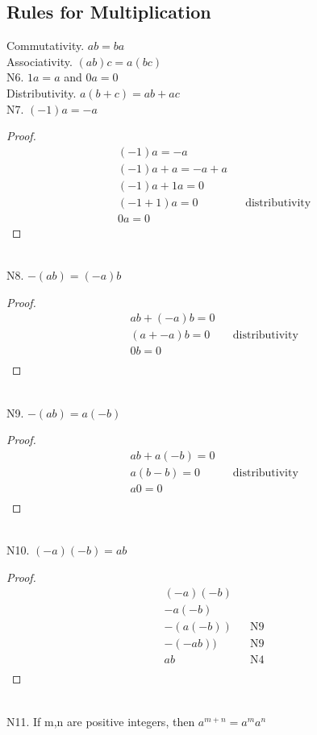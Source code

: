 \documentclass{article}
\begin{document}
\subsection{Rules for Multiplication}
Commutativity. $ab = ba$ \\
Associativity. $(ab)c = a(bc)$ \\
N6. $1a=a$ and $0a=0$\\
Distributivity. $a(b+c) = ab+ac$\\
N7. $(-1)a = -a$
\begin{proof}
 \begin{align*}
	&(-1)a = -a\\
	&(-1)a + a = -a + a\\
	&(-1)a + 1a = 0\\
	&(-1 + 1)a = 0 &&\text{distributivity}\\
	&0a = 0
 \end{align*}
\end{proof}
\leavevmode \\
N8. $-(ab) = (-a)b$
\begin{proof}
 \begin{align*}
	&ab + (-a)b = 0\\
	&(a+-a)b = 0 &&\text{distributivity}\\
	&0b = 0\\
 \end{align*}
\end{proof}
\leavevmode \\
N9. $-(ab) = a(-b)$
\begin{proof}
 \begin{align*}
	&ab + a(-b) = 0\\
	&a(b-b) = 0 &&\text{distributivity}\\
	&a0 = 0\\
 \end{align*}
\end{proof}
\leavevmode \\
N10. $(-a)(-b) = ab$
\begin{proof}
 \begin{align*}
	&(-a)(-b)\\
	&-a(-b)\\
	&-(a(-b))&&\text{N9}\\
	&-(-ab))&&\text{N9}\\
	&ab&&\text{N4}\\
 \end{align*}
\end{proof}
\leavevmode \\
N11. If m,n are positive integers, then $a^{m+n} = a^ma^n$\\
\end{document}

